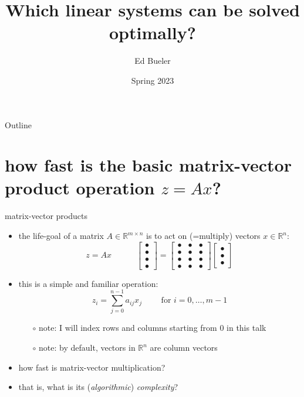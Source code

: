\documentclass[10pt,
               svgnames,
               hyperref={colorlinks,citecolor=DeepPink4,linkcolor=FireBrick,urlcolor=Maroon},
               usepdftitle=false]{beamer}
\title{Which linear systems can be solved optimally?}
\author{Ed Bueler}
\institute[]{UAF Math 692 Scalable Seminar}
\date{Spring 2023}
\newcommand{\RR}{\mathbb{R}}
\begin{document}
\beamertemplatenavigationsymbolsempty

\begin{frame}
  \maketitle
\end{frame}

\begin{frame}{Outline}
  \tableofcontents[hideallsubsections]
\end{frame}

\section{how fast is the basic matrix-vector product operation $z=Ax$?}

\newcommand{\bulletax}{\begin{bmatrix} \bullet \\ \bullet \\ \bullet \\ \bullet \end{bmatrix} = \begin{bmatrix} \bullet & \bullet & \bullet \\ \bullet & \bullet & \bullet \\ \bullet & \bullet & \bullet \\ \bullet & \bullet & \bullet \end{bmatrix} \begin{bmatrix} \bullet \\ \bullet \\ \bullet \end{bmatrix}}

\begin{frame}{matrix-vector products}
\begin{itemize}
\item the life-goal of a matrix $A \in \RR^{m\times n}$ is to act on (=multiply) vectors $x \in \RR^n$:
    $$z = Ax \qquad\quad \bulletax$$
\item this is a simple and familiar operation:
    $$z_i = \sum_{j=0}^{n-1} a_{ij} x_j \qquad \text{ for } i=0,\dots,m-1$$

    \begin{itemize}
    \item[$\circ$] note: I will index rows and columns starting from 0 in this talk
    \item[$\circ$] note: by default, vectors in $\RR^n$ are column vectors
    \end{itemize}
\item how fast is matrix-vector multiplication?
\item that is, what is its (\emph{algorithmic}) \emph{complexity}?
\end{itemize}
\end{frame}
\end{document}
